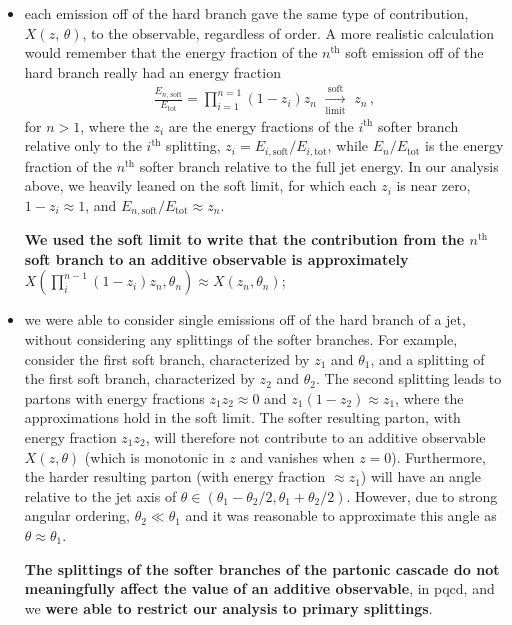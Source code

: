 \begin{itemize}
     \item
        each emission off of the hard branch gave the same type of contribution, \(X(z,\,\theta)\), to the observable, regardless of order.
        A more realistic calculation would remember that the energy fraction of the \(n^\text{th}\) soft emission off of the hard branch really had an energy fraction
        \begin{align}
            \frac{E_{n,\,\text{soft}}}{E_\text{tot}}
            =
            \prod_{i = 1}^{n=1}
            (1-z_i)
            z_n
            \,\,
            \xrightarrow[\text{limit}]{\text{soft}}
            \,\,
            z_n
            \,,
        \end{align}
        for \(n > 1\), where the \(z_i\) are the energy fractions of the \(i^\text{th}\) softer branch relative only to the \(i^\text{th}\) splitting, \(z_i = E_{i,\text{soft}}/E_{i,\text{tot}}\), while \(E_n/E_\text{tot}\) is the energy fraction of the \(n^\text{th}\) softer branch relative to the full jet energy.
        In our analysis above, we heavily leaned on the soft limit, for which each \(z_i\) is near zero, \(1-z_i \approx 1\), and \(E_{n,\text{soft}}/E_\text{tot} \approx z_n\).

        \textbf{We used the soft limit to write that the contribution from the \(n^\text{th}\) soft branch to an additive observable is approximately} \(X(\prod_{i}^{n-1} (1-z_i) z_n, \theta_n) \approx X(z_n, \theta_n)\);


     \item
         we were able to consider single emissions off of the hard branch of a jet, without considering any splittings of the softer branches.
         For example, consider the first soft branch, characterized by \(z_1\) and \(\theta_1\), and a splitting of the first soft branch, characterized by \(z_2\) and \(\theta_2\).
         The second splitting leads to partons with energy fractions \(z_1 z_2 \approx 0\) and \(z_1 (1-z_2) \approx z_1\), where the approximations hold in the soft limit.
         The softer resulting parton, with energy fraction \(z_1 z_2\), will therefore not contribute to an additive observable \(X(z,\theta)\) (which is monotonic in \(z\) and vanishes when \(z = 0\)).
         Furthermore, the harder resulting parton (with energy fraction \(\approx z_1\)) will have an angle relative to the jet axis of \(\theta \in (\theta_1 - \theta_2/2, \theta_1 + \theta_2/2)\).
         However, due to strong angular ordering, \(\theta_2 \ll \theta_1\) and it was reasonable to approximate this angle as \(\theta \approx \theta_1\).

         \textbf{The splittings of the softer branches of the partonic cascade do not meaningfully affect the value of an additive observable}, in \gls{pqcd}, and we \textbf{were able to restrict our analysis to primary splittings}.
\end{itemize}

